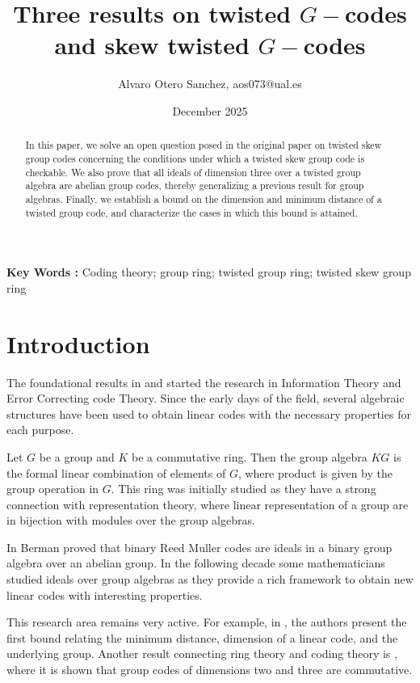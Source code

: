 \documentclass{article}
\title{Three results on twisted $G-$codes and skew twisted $G-$codes}
\author{Alvaro Otero Sanchez, aos073@ual.es}
\date{December 2025}
\begin{document}
\maketitle

\begin{abstract}
In this paper, we solve an open question posed in the original paper on twisted skew group codes concerning the conditions under which a twisted skew group code is checkable. We also prove that all ideals of dimension three over a twisted group algebra are abelian group codes, thereby generalizing a previous result for group algebras. Finally, we establish a bound on the dimension and minimum distance of a twisted group code, and characterize the cases in which this bound is attained.
\end{abstract}

\medskip

\noindent \textbf{Key Words : } Coding theory; group ring; twisted group ring; twisted skew group ring

\medskip

\section{Introduction}
The foundational results in \cite{Shannon1948} and \cite{Hamming1950} started the research in Information Theory and Error Correcting code Theory. Since the early days of the field, several algebraic structures have been used to obtain linear codes with the necessary properties for each purpose. 

Let $G$ be a group and $K$ be a commutative ring. Then the group algebra $KG$ is the formal linear combination of elements of $G$, where product is given by the group operation in $G$. This ring was initially studied as they have a strong connection with representation theory, where linear representation of a group are in bijection with modules over the group algebras. 

In \cite{Berman1967} Berman proved that binary Reed Muller codes are ideals in a binary group algebra over an abelian group. In the following decade some mathematicians studied ideals over group algebras as they provide a rich framework to obtain new linear codes with interesting properties. 

This research area remains very active. For example, in \cite{BorelloDeLaCruzWillems2022}, the authors present the first bound relating the minimum distance, dimension of a linear code, and the underlying group. Another result connecting ring theory and coding theory is \cite{GARCIAPILLADO2019167}, where it is shown that group codes of dimensions two and three are commutative.
\end{document}
